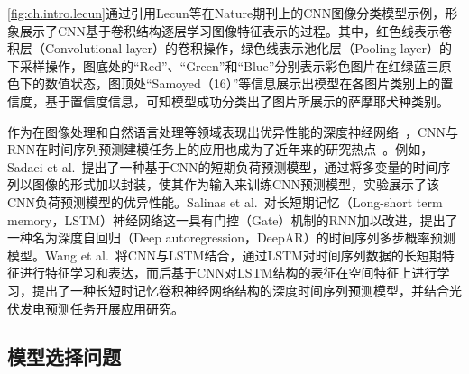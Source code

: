 \autoref{fig:ch.intro.lecun}通过引用Lecun等\cite{lecunDeep2015}在Nature期刊上的CNN图像分类模型示例，形象展示了CNN基于卷积结构逐层学习图像特征表示的过程。其中，红色线表示卷积层（Convolutional layer）的卷积操作，绿色线表示池化层（Pooling layer）的下采样操作，图底处的“Red”、“Green”和“Blue”分别表示彩色图片在红绿蓝三原色下的数值状态，图顶处“Samoyed（16）”等信息展示出模型在各图片类别上的置信度，基于置信度信息，可知模型成功分类出了图片所展示的萨摩耶犬种类别。

作为在图像处理和自然语言处理等领域表现出优异性能的深度神经网络~\cite{alomStateoftheart2019}，CNN与RNN在时间序列预测建模任务上的应用也成为了近年来的研究热点~\cite{sezerFinancial2020,lindbergLongterm2019,mudelseeTrend2019}。例如，Sadaei et al.~\cite{sadaei2019short}提出了一种基于CNN的短期负荷预测模型，通过将多变量的时间序列以图像的形式加以封装，使其作为输入来训练CNN预测模型，实验展示了该CNN负荷预测模型的优异性能。Salinas et al.~\cite{salinasDeepAR2020}对长短期记忆（Long-short term memory，LSTM）神经网络这一具有门控（Gate）机制的RNN加以改进，提出了一种名为深度自回归（Deep autoregression，DeepAR）的时间序列多步概率预测模型。Wang et al.~\cite{wangPhotovoltaic2019}将CNN与LSTM结合，通过LSTM对时间序列数据的长短期特征进行特征学习和表达，而后基于CNN对LSTM结构的表征在空间特征上进行学习，提出了一种长短时记忆卷积神经网络结构的深度时间序列预测模型，并结合光伏发电预测任务开展应用研究。



\subsection{模型选择问题}

